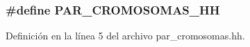 \subsubsection[{P\+A\+R\+\_\+\+C\+R\+O\+M\+O\+S\+O\+M\+A\+S\+\_\+\+H\+H}]{\setlength{\rightskip}{0pt plus 5cm}\#define P\+A\+R\+\_\+\+C\+R\+O\+M\+O\+S\+O\+M\+A\+S\+\_\+\+H\+H}\label{par__cromosomas_8hh_a76f8c8fb616d504ef7e9ff7b6d22af93}


Definición en la línea 5 del archivo par\+\_\+cromosomas.\+hh.

